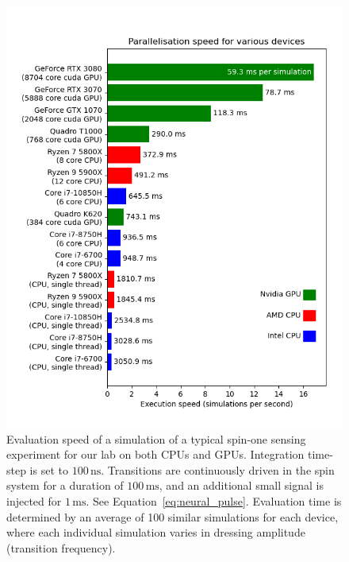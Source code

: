 \documentclass{jors}
\begin{document}
		\begin{figure}[htbp!]
			\centering
			\includegraphics[scale=0.6]{benchmark_device_aggregate.png}
			\caption{Evaluation speed of a simulation of a typical spin-one sensing experiment for our lab on both CPUs and GPUs.
			Integration time-step is set to $ 100\,\text{ns} $.
			Transitions are continuously driven in the spin system for a duration of $ 100\,\text{ms} $, and an additional small signal is injected for $ 1\,\text{ms} $.
			See Equation~\eqref{eq:neural_pulse}.
			Evaluation time is determined by an average of 100 similar simulations for each device, where each individual simulation varies in dressing amplitude (transition frequency).}
			\label{fig:benchmark_device_aggregate}
		\end{figure}
\end{document}
